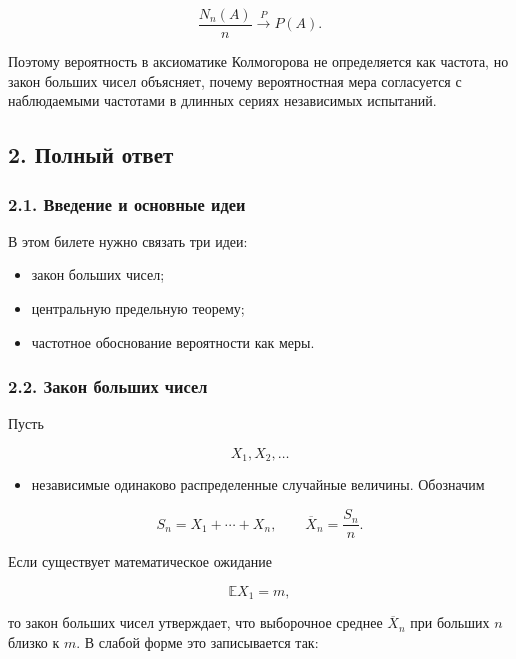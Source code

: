 \documentclass[
  11pt,
  a4paper,
]{article}
\providecommand{\tightlist}{%
  \setlength{\itemsep}{0pt}\setlength{\parskip}{0pt}}
\begin{document}
\[
\frac{N_n(A)}{n}\xrightarrow{P}P(A).
\]

Поэтому вероятность в аксиоматике Колмогорова не определяется как
частота, но закон больших чисел объясняет, почему вероятностная мера
согласуется с наблюдаемыми частотами в длинных сериях независимых
испытаний.

\subsection{2. Полный
ответ}\label{ux43fux43eux43bux43dux44bux439-ux43eux442ux432ux435ux442}

\subsubsection{2.1. Введение и основные
идеи}\label{ux432ux432ux435ux434ux435ux43dux438ux435-ux438-ux43eux441ux43dux43eux432ux43dux44bux435-ux438ux434ux435ux438}

В этом билете нужно связать три идеи:

\begin{itemize}
\tightlist
\item
  закон больших чисел;
\item
  центральную предельную теорему;
\item
  частотное обоснование вероятности как меры.
\end{itemize}

\subsubsection{2.2. Закон больших
чисел}\label{ux437ux430ux43aux43eux43d-ux431ux43eux43bux44cux448ux438ux445-ux447ux438ux441ux435ux43b}

Пусть

\[
X_1,X_2,\ldots
\]

\begin{itemize}
\tightlist
\item
  независимые одинаково распределенные случайные величины. Обозначим
\end{itemize}

\[
S_n=X_1+\cdots+X_n,
\qquad
\overline X_n=\frac{S_n}{n}.
\]

Если существует математическое ожидание

\[
\mathbb EX_1=m,
\]

то закон больших чисел утверждает, что выборочное среднее
\(\overline X_n\) при больших \(n\) близко к \(m\). В слабой форме это
записывается так:
\end{document}
